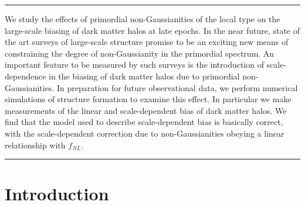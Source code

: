 \documentclass[10pt,letterpaper,final]{iopart}
\numberwithin{equation}{subsection}
\def\ni{\noindent}
\begin{document}
\begin{titlepage}
\vspace{1.5cm}
\hrule \vspace{0.3cm}
\ni {\fontsize{10}{15}\selectfont \sffamily \bfseries Abstract}
\vspace{0.3cm}

{\fontsize{10}{15}\selectfont \ni We study the effects of primordial non-Gaussianities of the local type on the large-scale biasing of dark matter halos at late epochs. In the near future, state of the art surveys of large-scale structure promise to be an exciting new means of constraining the degree of non-Gaussianity in the primordial spectrum. An important feature to be measured by such surveys is the introduction of scale-dependence in the biasing of dark matter halos due to primordial non-Gaussianities. In preparation for future observational data, we perform numerical simulations of structure formation to examine this effect. In particular we make measurements of the linear and scale-dependent bias of dark matter halos. We find that the model used to describe scale-dependent bias is basically correct, with the scale-dependent correction due to non-Gaussianities obeying a linear relationship with $f_{NL}$.}

\vskip 10pt
\hrule


\end{titlepage}


\thispagestyle{empty}


\tableofcontents


\pagebreak




%
%

\section{Introduction}
\end{document}
